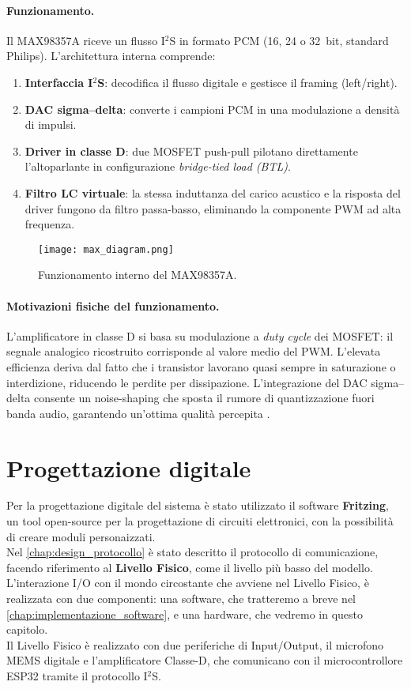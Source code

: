 \newpage
\paragraph{Funzionamento.}
Il MAX98357A riceve un flusso I$^2$S in formato PCM (\SI{16}{}, \SI{24}{} o \SI{32}{bit}, standard Philips). L’architettura interna comprende:
\begin{enumerate}
  \item \textbf{Interfaccia I$^2$S}: decodifica il flusso digitale e gestisce il framing (left/right).
  \item \textbf{DAC sigma–delta}: converte i campioni PCM in una modulazione a densità di impulsi.
  \item \textbf{Driver in classe D}: due MOSFET push-pull pilotano direttamente l’altoparlante in configurazione \emph{bridge-tied load (BTL)}.
  \item \textbf{Filtro LC virtuale}: la stessa induttanza del carico acustico e la risposta del driver fungono da filtro passa-basso, eliminando la componente PWM ad alta frequenza.
\end{enumerate}
\begin{figure}[H]
  \centering
  \texttt{[image: max\_diagram.png]}
  \caption{Funzionamento interno del MAX98357A.}
  \label{fig:max_diagram}
  \end{figure}
\paragraph{Motivazioni fisiche del funzionamento.}
L’amplificatore in classe D si basa su modulazione a \emph{duty cycle} dei MOSFET: il segnale analogico ricostruito corrisponde al valore medio del PWM.
 L’elevata efficienza deriva dal fatto che i transistor lavorano quasi sempre in saturazione o interdizione, riducendo le perdite per dissipazione.
 L’integrazione del DAC sigma–delta consente un noise-shaping che sposta il rumore di quantizzazione fuori banda audio, garantendo un’ottima qualità
  percepita \citep{adafruit-max98357-datasheet}.

\section{Progettazione digitale}
Per la progettazione digitale del sistema è stato utilizzato il software \textbf{Fritzing}, un tool open-source
per la progettazione di circuiti elettronici, con la possibilità di creare moduli personaizzati.\\
Nel \autoref{chap:design_protocollo} è stato descritto il protocollo di comunicazione, facendo riferimento al \textbf{Livello Fisico},
come il livello più basso del modello. L'interazione I/O con il mondo circostante che avviene nel Livello Fisico, è realizzata con due componenti: una software, 
che tratteremo a breve nel \autoref{chap:implementazione_software}, e una hardware, che vedremo in questo capitolo.\\
Il Livello Fisico è realizzato con due periferiche di Input/Output, il microfono MEMS digitale e l'amplificatore Classe-D, che comunicano con il microcontrollore ESP32
 tramite il protocollo I$^2$S.\\

